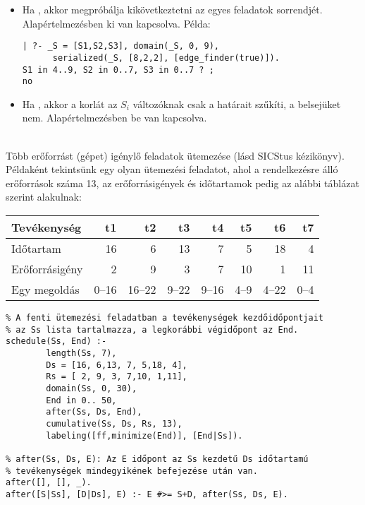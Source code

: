 \begin{itemize}
\item {}
          Ha  , akkor megpróbálja kikövetkeztetni az egyes
          feladatok sorrendjét. Alapértelmezésben ki van kapcsolva. Példa:
\begin{verbatim}
| ?- _S = [S1,S2,S3], domain(_S, 0, 9),
      serialized(_S, [8,2,2], [edge_finder(true)]).
S1 in 4..9, S2 in 0..7, S3 in 0..7 ? ;
no
\end{verbatim}

\item {}
          Ha  , akkor a korlát az $S_i$ változóknak
          csak a határait szűkíti, a belsejüket nem. Alapértelmezésben be van kapcsolva.

\end{itemize}

\medskip

{} \\
Több erőforrást (gépet) igénylő feladatok ütemezése (lásd SICStus kézikönyv).
\br
Példaként tekintsünk egy olyan ütemezési feladatot, ahol a rendelkezésre álló
erőforrások száma 13, az erőforrásigények és időtartamok pedig az alábbi táblázat
szerint alakulnak:

\begin{center}
\begin{tabular}{|l|r|r|r|r|r|r|r|}
\hline
Tevékenység               & t1   & t2    & t3   & t4   & t5   & t6   & t7 \\ 
\hline                                                         
Időtartam                 & 16   & 6     & 13   & 7    & 5    & 18   & 4 \\  
Erőforrásigény            & 2    & 9     & 3    & 7    &10    & 1    &11\\   
\hline
\hline
Egy megoldás              &0--16 &16--22 &9--22 &9--16 &4--9  &4--22 &0--4\\
\hline
\end{tabular}
\end{center}

\begin{verbatim}
% A fenti ütemezési feladatban a tevékenységek kezdőidőpontjait
% az Ss lista tartalmazza, a legkorábbi végidőpont az End.
schedule(Ss, End) :-
        length(Ss, 7),
        Ds = [16, 6,13, 7, 5,18, 4],
        Rs = [ 2, 9, 3, 7,10, 1,11],
        domain(Ss, 0, 30),
        End in 0.. 50,
        after(Ss, Ds, End),
        cumulative(Ss, Ds, Rs, 13),
        labeling([ff,minimize(End)], [End|Ss]).

% after(Ss, Ds, E): Az E időpont az Ss kezdetű Ds időtartamú 
% tevékenységek mindegyikének befejezése után van.
after([], [], _).
after([S|Ss], [D|Ds], E) :- E #>= S+D, after(Ss, Ds, E).
\end{verbatim}

